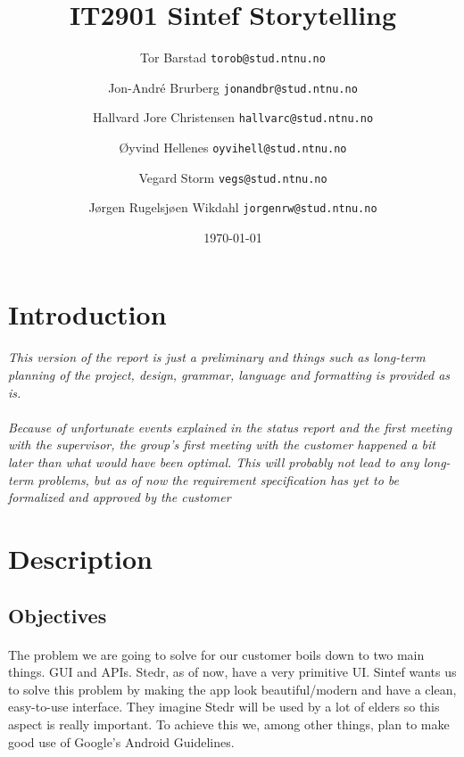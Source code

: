 \documentclass[12pt,a4paper,titlepage]{article}
\begin{document}
	\title{IT2901 Sintef Storytelling}
	\author{	
			Tor Barstad
			\texttt{torob@stud.ntnu.no}
			\and
			Jon-André Brurberg
			\texttt{jonandbr@stud.ntnu.no}
			\and
			Hallvard Jore Christensen
			\texttt{hallvarc@stud.ntnu.no}
			\and
			Øyvind Hellenes
			\texttt{oyvihell@stud.ntnu.no}				
			\and
			Vegard Storm
			\texttt{vegs@stud.ntnu.no}		
			\and
			Jørgen Rugelsjøen Wikdahl
			\texttt{jorgenrw@stud.ntnu.no}			
			}		
		\date{\today}
		\maketitle{}	

		\pagestyle{empty}
		\tableofcontents
		\cleardoublepage
		\pagestyle{plain}	

\section{Introduction}
	\setcounter{page}{1}
		\paragraph{}
						\textit{This version of the report is just a preliminary and things such as long-term planning of the project, design, grammar, language and formatting is provided as is.}

						\paragraph{}

						\textit{Because of unfortunate events explained in the status report and the first meeting with the supervisor,  the group's first meeting with the customer happened a bit later than what would have been optimal. This will probably not lead to any long-term problems, but as of now the requirement specification has yet to be formalized and approved by the customer}

		\section{Description}
			\subsection{Objectives}
				\paragraph{}
The problem we are going to solve for our customer boils down to two main things. GUI and APIs. Stedr, as of now, have a very primitive UI. Sintef wants us to solve this problem by making the app look beautiful/modern and have a clean, easy-to-use interface. They imagine Stedr will be used by a lot of elders so this aspect is really important. To achieve this we, among other things,  plan to make good use of Google's Android Guidelines.
\end{document}
